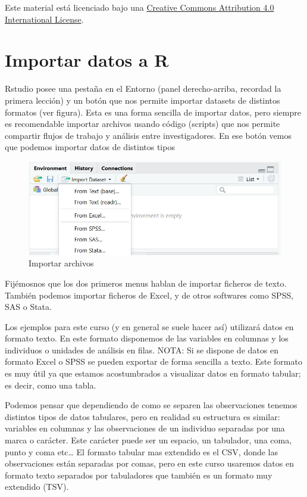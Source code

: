 \documentclass[
]{book}
\begin{document}
Este material está licenciado bajo una \href{https://creativecommons.org/licenses/by/4.0/}{Creative Commons Attribution 4.0 International License}.

\hypertarget{importar}{%
\chapter{Importar datos a R}\label{importar}}

Rstudio posee una pestaña en el Entorno (panel derecho-arriba, recordad la primera lección) y un botón que nos permite importar datasets de distintos formatos (ver figura). Esta es una forma sencilla de importar datos, pero siempre es recomendable importar archivos usando código (scripts) que nos permite compartir flujos de trabajo y análisis entre investigadores. En ese botón vemos que podemos importar datos de distintos tipos

\begin{figure}
\centering
\includegraphics{figures/manual_import.png}
\caption{Importar archivos}
\end{figure}

Fijémosnos que los dos primeros menus hablan de importar ficheros de texto. También podemos importar ficheros de Excel, y de otros softwares como SPSS, SAS o Stata.

Los ejemplos para este curso (y en general se suele hacer así) utilizará datos en formato texto. En este formato disponemos de las variables en columnas y los individuos o unidades de análisis en filas. NOTA: Si se dispone de datos en formato Excel o SPSS se pueden exportar de forma sencilla a texto. Este formato es muy útil ya que estamos acostumbrados a visualizar datos en formato tabular; es decir, como una tabla.

Podemos pensar que dependiendo de como se separen las observaciones tenemos distintos tipos de datos tabulares, pero en realidad su estructura es similar: variables en columnas y las observaciones de un individuo separadas por una marca o carácter. Este carácter puede ser un espacio, un tabulador, una coma, punto y coma etc\ldots{} El formato tabular mas extendido es el CSV, donde las observaciones están separadas por comas, pero en este curso usaremos datos en formato texto separados por tabuladores que también es un formato muy extendido (TSV).
\end{document}
